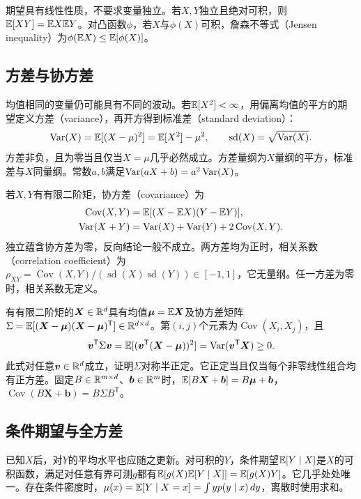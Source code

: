 期望具有线性性质，不要求变量独立。若$X,Y$独立且绝对可积，则$\mathbb{E}[XY]=\mathbb{E} X\mathbb{E} Y$。对凸函数$\phi$，若$X$与$\phi(X)$可积，詹森不等式（Jensen inequality）为$\phi(\mathbb{E} X)\leq\mathbb{E}[\phi(X)]$。

\subsection{方差与协方差}
均值相同的变量仍可能具有不同的波动。若$\mathbb{E}[X^2]<\infty$，用偏离均值的平方的期望定义方差（variance），再开方得到标准差（standard deviation）：
\begin{equation}
 \operatorname{Var}(X)=\mathbb{E}[(X-\mu)^2]=\mathbb{E}[X^2]-\mu^2,\qquad
 \operatorname{sd}(X)=\sqrt{\operatorname{Var}(X)}.
\end{equation}
方差非负，且为零当且仅当$X=\mu$几乎必然成立。方差量纲为$X$量纲的平方，标准差与$X$同量纲。常数$a,b$满足$\operatorname{Var}(aX+b)=a^2\operatorname{Var}(X)$。

若$X,Y$有有限二阶矩，协方差（covariance）为
\begin{align}
 \operatorname{Cov}(X,Y)&=\mathbb{E}[(X-\mathbb{E} X)(Y-\mathbb{E} Y)],\\
 \operatorname{Var}(X+Y)&=\operatorname{Var}(X)+\operatorname{Var}(Y)+2\operatorname{Cov}(X,Y).
\end{align}
独立蕴含协方差为零，反向结论一般不成立。两方差均为正时，相关系数（correlation coefficient）为$\rho_{XY}=\operatorname{Cov}(X,Y)/(\operatorname{sd}(X)\operatorname{sd}(Y))\in[-1,1]$，它无量纲。任一方差为零时，相关系数无定义。

有有限二阶矩的$\bm X\in\mathbb{R}^d$具有均值$\bm\mu=\mathbb{E}\bm X$及协方差矩阵$\Sigma=\mathbb{E}[(\bm X-\bm\mu)(\bm X-\bm\mu)^{\mathsf T}]\in\mathbb{R}^{d\times d}$。第$(i,j)$个元素为$\operatorname{Cov}(X_i,X_j)$，且
\begin{equation}
 \bm v^{\mathsf T}\Sigma\bm v=\mathbb{E}[(\bm v^{\mathsf T}(\bm X-\bm\mu))^2]
 =\operatorname{Var}(\bm v^{\mathsf T}\bm X)\geq0.
 \label{eq:math-covariance-psd}
\end{equation}
此式对任意$\bm v\in\mathbb{R}^d$成立，证明$\Sigma$对称半正定。它正定当且仅当每个非零线性组合均有正方差。固定$B\in\mathbb{R}^{m\times d}$、$\bm b\in\mathbb{R}^m$时，$\mathbb{E}[B\bm X+\bm b]=B\bm\mu+\bm b$，$\operatorname{Cov}(B\bm X+\bm b)=B\Sigma B^{\mathsf T}$。

\subsection{条件期望与全方差}
已知$X$后，对$Y$的平均水平也应随之更新。对可积的$Y$，条件期望$\mathbb{E}[Y\mid X]$是$X$的可积函数，满足对任意有界可测$g$都有$\mathbb{E}[g(X)\mathbb{E}[Y\mid X]]=\mathbb{E}[g(X)Y]$。它几乎处处唯一。存在条件密度时，$\mu(x)=\mathbb{E}[Y\mid X=x]=\int yp(y\mid x)\,dy$，离散时使用求和。

